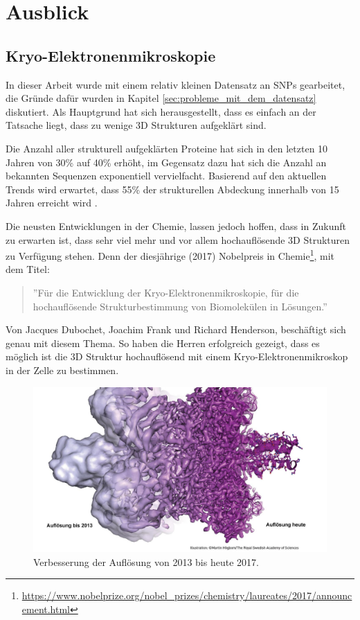 \chapter{Ausblick}



\section{Kryo-Elektronenmikroskopie}

In dieser Arbeit wurde mit einem relativ kleinen Datensatz an \ac{SNP}s gearbeitet, die Gründe dafür wurden in Kapitel \ref{sec:probleme_mit_dem_datensatz} diskutiert. Als Hauptgrund hat sich herausgestellt, dass es einfach an der Tatsache liegt, dass zu wenige 3D Strukturen aufgeklärt sind. 

Die Anzahl aller strukturell aufgeklärten Proteine hat sich in den letzten 10 Jahren von 30\% auf 40\% erhöht, im Gegensatz dazu hat sich die Anzahl an bekannten Sequenzen exponentiell vervielfacht. Basierend auf den aktuellen Trends wird erwartet, dass 55\% der strukturellen Abdeckung innerhalb von 15 Jahren erreicht wird \cite{Khafizov.2014}.

Die neusten Entwicklungen in der Chemie, lassen jedoch hoffen, dass in Zukunft zu erwarten ist, dass sehr viel mehr und vor allem hochauflösende 3D Strukturen zu Verfügung stehen. Denn der diesjährige (2017) Nobelpreis in Chemie\footnote{\url{https://www.nobelprize.org/nobel_prizes/chemistry/laureates/2017/announcement.html}
}, mit dem Titel:
\begin{quote}
    ''Für die Entwicklung der Kryo-Elektronenmikroskopie, für die hochauflösende Strukturbestimmung von Biomolekülen in Lösungen.''
\end{quote}
Von Jacques Dubochet, Joachim Frank und Richard Henderson, beschäftigt sich genau mit diesem Thema. So haben die Herren erfolgreich gezeigt, dass es möglich ist die 3D Struktur hochauflösend mit einem Kryo-Elektronenmikroskop in der Zelle zu bestimmen.

\begin{figure}
    \centering
    \includegraphics[width=.95\textwidth]{images/Verbesserung_der_Aufloesung.jpg}
    \caption{Verbesserung der Auflösung von 2013 bis heute 2017\protect\footnotemark{}.}
    \label{fig:verbesserte_aufloesung}
\end{figure}

